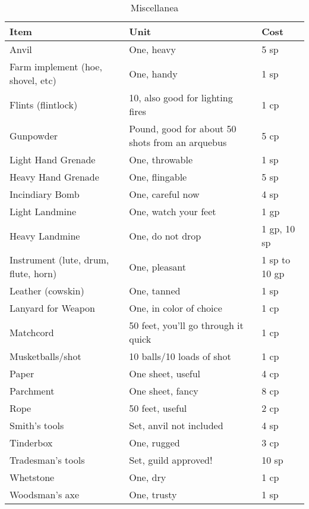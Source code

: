 \documentclass[oneside,11pt,english]{book}
\begin{document}
\begin{table}[hb]
  \centering
  \caption{Miscellanea}
  \label{tab:Miscellanea}
  \begin{tabu} spread 0pt {*{3}{X[-1]}}
    Item &Unit &Cost\\\toprule
    Anvil &One, heavy &5 sp\\
    Farm implement (hoe, shovel, etc) &One, handy &1 sp\\
    Flints (flintlock) &10, also good for lighting fires &1 cp\\
    Gunpowder &Pound, good for about 50 shots from an arquebus &5 cp\\
    Light Hand Grenade &One, throwable &1 sp\\
    Heavy Hand Grenade &One, flingable &5 sp\\
    Incindiary Bomb &One, careful now &4 sp\\
    Light Landmine &One, watch your feet &1 gp\\
    Heavy Landmine &One, do not drop &1 gp, 10 sp\\
    Instrument (lute, drum, flute, horn) &One, pleasant &1 sp to 10 gp\\
    Leather (cowskin) &One, tanned &1 sp\\
    Lanyard for Weapon &One, in color of choice &1 cp\\
    Matchcord &50 feet, you’ll go through it quick &1 cp\\
    Musketballs/shot &10 balls/10 loads of shot &1 cp\\
    Paper &One sheet, useful &4 cp\\
    Parchment &One sheet, fancy &8 cp\\
    Rope &50 feet, useful &2 cp\\
    Smith’s tools &Set, anvil not included &4 sp\\
    Tinderbox &One, rugged &3 cp\\
    Tradesman’s tools &Set, guild approved! &10 sp\\
    Whetstone &One, dry &1 cp\\
    Woodsman’s axe &One, trusty &1 sp\\
  \end{tabu}
\end{table}
\clearpage
\end{document}
